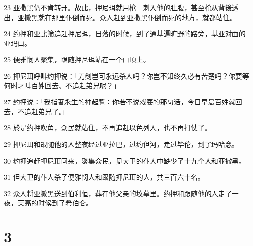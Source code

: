 \par 23 亚撒黑仍不肯转开。故此，押尼珥就用枪　刺入他的肚腹，甚至枪从背後透出，亚撒黑就在那里仆倒而死。众人赶到亚撒黑仆倒而死的地方，就都站住。
\par 24 约押和亚比筛追赶押尼珥，日落的时候，到了通基遍旷野的路旁，基亚对面的亚玛山。
\par 25 便雅悯人聚集，跟随押尼珥站在一个山顶上。
\par 26 押尼珥呼叫约押说：「刀剑岂可永远杀人吗？你岂不知终久必有苦楚吗？你要等何时才叫百姓回去、不追赶弟兄呢？」
\par 27 约押说：「我指著永生的神起誓：你若不说戏耍的那句话，今日早晨百姓就回去，不追赶弟兄了。」
\par 28 於是约押吹角，众民就站住，不再追赶以色列人，也不再打仗了。
\par 29 押尼珥和跟随他的人整夜经过亚拉巴，过约但河，走过毕伦，到了玛哈念。
\par 30 约押追赶押尼珥回来，聚集众民，见大卫的仆人中缺少了十九个人和亚撒黑。
\par 31 但大卫的仆人杀了便雅悯人和跟随押尼珥的人，共三百六十名。
\par 32 众人将亚撒黑送到伯利恒，葬在他父亲的坟墓里。约押和跟随他的人走了一夜，天亮的时候到了希伯仑。

\chapter{3}

